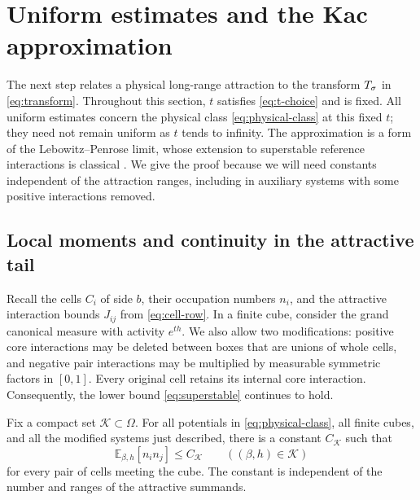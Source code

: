 \section{Uniform estimates and the Kac approximation}\label{sec:kac}

The next step relates a physical long-range attraction to the transform
\(T_\sigma\) in \eqref{eq:transform}.  Throughout this section, \(t\) satisfies
\eqref{eq:t-choice} and is fixed.  All uniform estimates concern the physical
class \eqref{eq:physical-class} at this fixed \(t\); they need not remain
uniform as \(t\) tends to infinity.  The approximation is a form of the
Lebowitz--Penrose limit, whose extension to superstable reference interactions
is classical \cite{LebowitzPenrose1966,GerardiEtAl1973}.  We give the proof
because we will need constants independent of the attraction ranges, including
in auxiliary systems with some positive interactions removed.

\subsection{Local moments and continuity in the attractive tail}

Recall the cells \(C_i\) of side \(b\), their occupation numbers \(n_i\), and
the attractive interaction bounds \(J_{ij}\) from \eqref{eq:cell-row}.
In a finite cube, consider the grand canonical measure with activity \(e^{th}\).
We also allow two modifications: positive core interactions may be deleted
between boxes that are unions of whole cells, and negative pair interactions
may be multiplied by measurable symmetric factors in \([0,1]\).
Every original cell retains its internal core interaction.  Consequently,
the lower bound \eqref{eq:superstable} continues to hold.

\begin{proposition}\label{prop:moments}
Fix a compact set \(\mathcal K\subset\Omega\).
For all potentials in \eqref{eq:physical-class}, all finite cubes, and all
the modified systems just described, there is a constant \(C_{\mathcal K}\)
such that
\[
 \mathbb E_{\beta,h}[n_i n_j]\le C_{\mathcal K}
 \qquad ((\beta,h)\in\mathcal K)
\]
for every pair of cells meeting the cube.  The constant is independent of
the number and ranges of the attractive summands.
\end{proposition}

